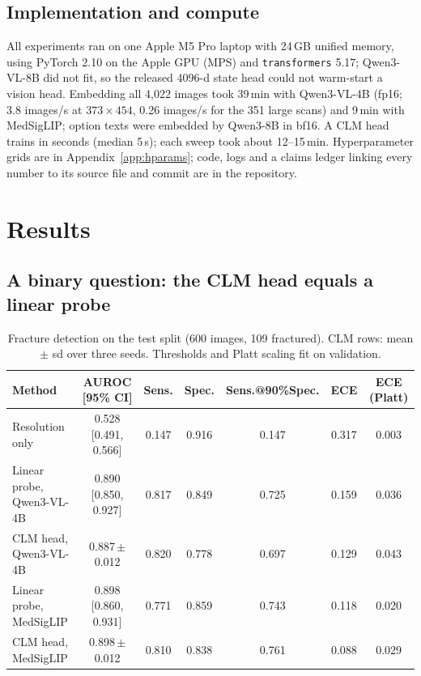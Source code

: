\documentclass[11pt]{article}
\newcommand{\pmsd}[2]{#1\,{\scriptsize$\pm$#2}}
\begin{document}
\subsection{Implementation and compute}

All experiments ran on one Apple M5 Pro laptop with 24\,GB unified memory, using PyTorch 2.10 on the Apple GPU
(MPS) and \texttt{transformers} 5.17; Qwen3-VL-8B did not fit, so the released 4096-d state head could not warm-start
a vision head. Embedding all 4{,}022 images took 39\,min with Qwen3-VL-4B (fp16; 3.8 images/s at $373\times454$,
0.26 images/s for the 351 large scans) and 9\,min with MedSigLIP; option texts were embedded by Qwen3-8B in bf16.
A CLM head trains in seconds (median 5\,s); each sweep took about 12--15\,min. Hyperparameter grids are in
Appendix~\ref{app:hparams}; code, logs and a claims ledger linking every number to its source file and commit are
in the repository.

\section{Results}
\label{sec:results}

\subsection{A binary question: the CLM head equals a linear probe}
\label{sec:binary}

\begin{table}[t]
  \centering\small
  \caption{Fracture detection on the test split (600 images, 109 fractured). CLM rows: mean $\pm$ sd over three
  seeds. Thresholds and Platt scaling fit on validation.}
  \label{tab:binary}
  \setlength{\tabcolsep}{4pt}
  \begin{tabular}{lcccccc}
    \toprule
    Method & AUROC [95\% CI] & Sens. & Spec. & Sens.@90\%Spec. & ECE & ECE (Platt) \\
    \midrule
    Resolution only & 0.528 [0.491, 0.566] & 0.147 & 0.916 & 0.147 & 0.317 & 0.003 \\
    Linear probe, Qwen3-VL-4B & 0.890 [0.850, 0.927] & 0.817 & 0.849 & 0.725 & 0.159 & 0.036 \\
    CLM head, Qwen3-VL-4B & \pmsd{0.887}{0.012} & 0.820 & 0.778 & 0.697 & 0.129 & 0.043 \\
    Linear probe, MedSigLIP & 0.898 [0.860, 0.931] & 0.771 & 0.859 & 0.743 & 0.118 & 0.020 \\
    CLM head, MedSigLIP & \pmsd{0.898}{0.012} & 0.810 & 0.838 & 0.761 & 0.088 & 0.029 \\
    \bottomrule
  \end{tabular}
\end{table}
\end{document}
